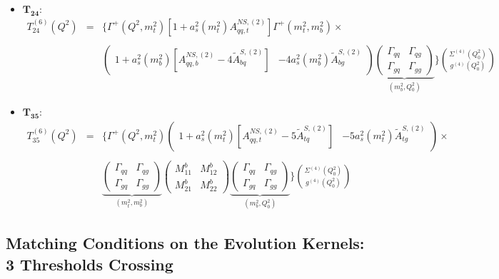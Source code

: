 \documentclass[10pt,a4paper]{article}
\begin{document}
\begin{itemize}
\item $\mathbf{T_{24}}$:
\begin{equation}
\begin{array}{rcl}
T^{(6)}_{24}(Q^2)&=&\displaystyle \Bigg\{\Gamma^{+}(Q^2,m_t^2)[1+a_s^2(m_t^2)A_{qq,t}^{N\!S,(2)}]\Gamma^{+}(m_t^2,m_b^2)\times\\
\\
& & \displaystyle \begin{pmatrix} 1+a_s^2(m_b^2)[A_{qq,b}^{N\!S,(2)}-4\tilde{A}^{S,(2)}_{bq}] & -4a_s^2(m_b^2)\tilde{A}^{S,(2)}_{bg}\end{pmatrix}\underbrace{\begin{pmatrix}\Gamma_{qq}& \Gamma_{qg} \\ \Gamma_{gq} & \Gamma_{gg}\end{pmatrix}}_{(m_b^2,Q_0^2)}\Bigg\}{\Sigma^{(4)}(Q_0^2) \choose g^{(4)}(Q_0^2)}
\end{array}
\end{equation}

\item $\mathbf{T_{35}}$:
\begin{equation}
\begin{array}{rcl}
\displaystyle T_{35}^{(6)}(Q^2)&=&\Bigg\{\Gamma^{+}(Q^2,m_t^2)\begin{pmatrix} 1+a_s^2(m_t^2)[A_{qq,t}^{N\!S,(2)}-5\tilde{A}^{S,(2)}_{tq}] & -5a_s^2(m_t^2)\tilde{A}^{S,(2)}_{tg}\end{pmatrix}\times\\
\\
 & & \displaystyle \underbrace{\begin{pmatrix}\Gamma_{qq}& \Gamma_{qg} \\ \Gamma_{gq} & \Gamma_{gg}\end{pmatrix}}_{(m_t^2,m_b^2)}\begin{pmatrix} M^b_{11} & M^b_{12} \\ M_{21}^b & M_{22}^b \end{pmatrix}\underbrace{\begin{pmatrix}\Gamma_{qq}& \Gamma_{qg} \\ \Gamma_{gq} & \Gamma_{gg}\end{pmatrix}}_{(m_b^2,Q_0^2)}\Bigg\}{\Sigma^{(4)}(Q_0^2) \choose g^{(4)}(Q_0^2)}
\end{array}
\end{equation}
\end{itemize}

\subsection{Matching Conditions on the Evolution Kernels: 3 Thresholds Crossing}
\end{document}
